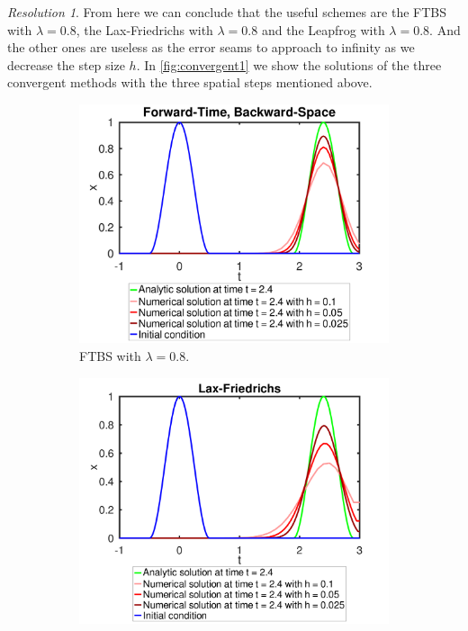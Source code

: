 \documentclass[10pt,a4paper]{article}
\theoremstyle{definition}
\theoremstyle{remark}
\newtheorem*{res}{Resolution}
\begin{document}
\begin{res}
  From here we can conclude that the useful schemes are the FTBS with $\lambda=0.8$, the Lax-Friedrichs with $\lambda=0.8$ and the Leapfrog with $\lambda=0.8$. And the other ones are useless as the error seams to approach to infinity as we decrease the step size $h$. In \cref{fig:convergent1} we show the solutions of the three convergent methods with the three spatial steps mentioned above.
  \begin{figure}[ht]
    \centering
    \begin{subfigure}{0.49\textwidth}
      \centering
      \includegraphics[width=\textwidth]{Images/ftbs.pdf}
      \caption{FTBS with $\lambda=0.8$.}
    \end{subfigure}\hfill
    \begin{subfigure}{0.49\textwidth}
      \centering
      \includegraphics[width=\textwidth]{Images/lf.pdf}

\end{subfigure}
\end{figure}
\end{res}
\end{document}
